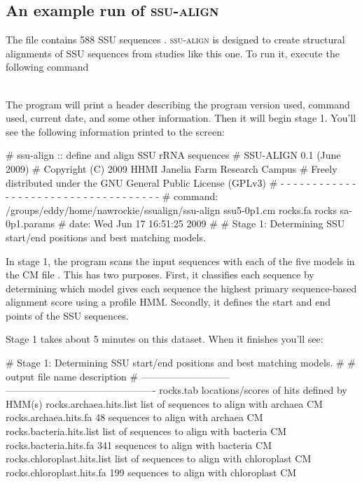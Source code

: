 \subsection{An example run of \textsc{ssu-align}}

The file  contains 588 SSU sequences
\cite{Walker07}. \textsc{ssu-align} is designed to create structural
alignments of SSU sequences from studies like this one. To run it,
execute the following command

\\

The program will print a header describing the program version used,
command used, current date, and some other information. Then it will
begin stage 1. You'll see the following information printed to the
screen:

\begin{sreoutput}
# ssu-align :: define and align SSU rRNA sequences
# SSU-ALIGN 0.1 (June 2009)
# Copyright (C) 2009 HHMI Janelia Farm Research Campus
# Freely distributed under the GNU General Public License (GPLv3)
# - - - - - - - - - - - - - - - - - - - - - - - - - - - - - - - - - - - -
# command: /groups/eddy/home/nawrockie/ssualign/ssu-align ssu5-0p1.cm rocks.fa rocks sa-0p1.params
# date:    Wed Jun 17 16:51:25 2009
#
# Stage 1: Determining SSU start/end positions and best matching models.
\end{sreoutput}

In stage 1, the program scans the input sequences with each of the
five models in the CM file . This has two
purposes.  First, it classifies each sequence by determining which
model gives each sequence the highest primary sequence-based alignment
score using a profile HMM. Secondly, it defines the start and end
points of the SSU sequences.

Stage 1 takes about 5 minutes on this dataset. When it finishes you'll
see: 

\begin{sreoutput}
# Stage 1: Determining SSU start/end positions and best matching models.
#
# output file name             description                                   
# ---------------------------  ----------------------------------------------
  rocks.tab                    locations/scores of hits defined by HMM(s)
  rocks.archaea.hits.list      list of sequences to align with archaea CM
  rocks.archaea.hits.fa             48 sequences to align with archaea CM
  rocks.bacteria.hits.list     list of sequences to align with bacteria CM
  rocks.bacteria.hits.fa           341 sequences to align with bacteria CM
  rocks.chloroplast.hits.list  list of sequences to align with chloroplast CM
  rocks.chloroplast.hits.fa        199 sequences to align with chloroplast CM
\end{sreoutput}

